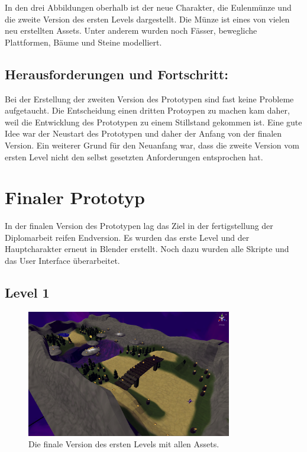 In den drei Abbildungen oberhalb ist der neue Charakter, die Eulenmünze und die zweite Version des ersten Levels dargestellt. Die Münze ist eines von vielen neu erstellten Assets. Unter anderem wurden noch Fässer, bewegliche Plattformen, Bäume und Steine modelliert.
\pagebreak

\subsection{Herausforderungen und Fortschritt:}

Bei der Erstellung der zweiten Version des Prototypen sind fast keine Probleme aufgetaucht. Die Entscheidung einen dritten Protoypen zu machen kam daher, weil die Entwicklung des Prototypen zu einem Stillstand gekommen ist. Eine gute Idee war der Neustart des Prototypen und daher der Anfang von der finalen Version. Ein weiterer Grund für den Neuanfang war, dass die zweite Version vom ersten Level nicht den selbst gesetzten Anforderungen entsprochen hat.  

\pagebreak

\section{Finaler Prototyp}

In der finalen Version des Prototypen lag das Ziel in der fertigstellung der Diplomarbeit reifen Endversion. Es wurden das erste Level und der Hauptcharakter erneut in Blender erstellt. Noch dazu wurden alle Skripte und das User Interface überarbeitet. 

\subsection{Level 1}

\begin{figure}[h]
  \centering
  \includegraphics*[width=0.8\textwidth]{chapters/04/images/V3/Level1.png}
  \caption{Die finale Version des ersten Levels mit allen Assets.}
  \label{fig:PE08}
\end{figure}

